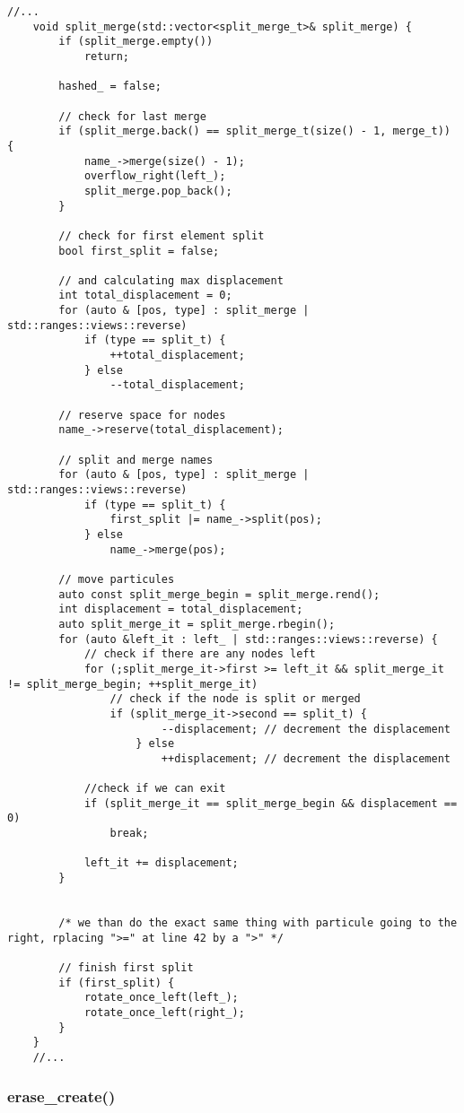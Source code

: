 \documentclass[11pt]{article}
\begin{document}
\begin{lstlisting}[style=CStyle]
	//...
	void split_merge(std::vector<split_merge_t>& split_merge) {
		if (split_merge.empty())
			return;
		
		hashed_ = false;

		// check for last merge
		if (split_merge.back() == split_merge_t(size() - 1, merge_t)) {
			name_->merge(size() - 1);
			overflow_right(left_);	
			split_merge.pop_back();
		}
			
		// check for first element split 
		bool first_split = false;

		// and calculating max displacement 
		int total_displacement = 0;
		for (auto & [pos, type] : split_merge | std::ranges::views::reverse)
			if (type == split_t) {
				++total_displacement;
			} else
				--total_displacement;

		// reserve space for nodes
		name_->reserve(total_displacement);

		// split and merge names
		for (auto & [pos, type] : split_merge | std::ranges::views::reverse)
			if (type == split_t) {
				first_split |= name_->split(pos);
			} else
				name_->merge(pos);

		// move particules
		auto const split_merge_begin = split_merge.rend();
		int displacement = total_displacement;
		auto split_merge_it = split_merge.rbegin();
		for (auto &left_it : left_ | std::ranges::views::reverse) {
			// check if there are any nodes left
			for (;split_merge_it->first >= left_it && split_merge_it != split_merge_begin; ++split_merge_it)
				// check if the node is split or merged
				if (split_merge_it->second == split_t) {
						--displacement; // decrement the displacement 
					} else
						++displacement; // decrement the displacement

			//check if we can exit
			if (split_merge_it == split_merge_begin && displacement == 0)
				break;

			left_it += displacement;
		}
	

		/* we than do the exact same thing with particule going to the right, rplacing ">=" at line 42 by a ">" */
		
		// finish first split 
		if (first_split) {
			rotate_once_left(left_);
			rotate_once_left(right_);
		}
	}
	//...
\end{lstlisting}

\subsubsection{erase\_create()}
\end{document}

